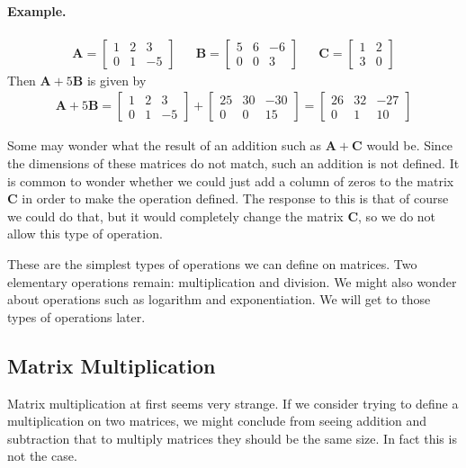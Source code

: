 \documentclass[11pt]{article}
\newcommand{\mat}[1]{\mathbf{#1}}
\begin{document}
\paragraph{Example.}
\begin{align*}
\mat{A} = \begin{bmatrix} 1 & 2 & 3 \\ 0 & 1 & -5\end{bmatrix}
&&
\mat{B} = \begin{bmatrix} 5 & 6 & -6 \\ 0 & 0 & 3\end{bmatrix}
&&
\mat{C} = \begin{bmatrix} 1 & 2 \\ 3 & 0\end{bmatrix}
\end{align*}
Then $\mat{A} + 5\mat{B}$ is given by
\begin{align*}
\mat{A} + 5\mat{B}
=
\begin{bmatrix} 1 & 2 & 3 \\ 0 & 1 & -5\end{bmatrix} +
\begin{bmatrix} 25 & 30 & -30 \\ 0 & 0 & 15\end{bmatrix}
=
\begin{bmatrix} 26 & 32 & -27 \\ 0 & 1 & 10\end{bmatrix}
\end{align*}

Some may wonder what the result of an addition such as $\mat{A} + \mat{C}$ would be. Since the dimensions of these matrices do not match, such an addition is not defined. It is common to wonder whether we could just add a column of zeros to the matrix $\mat{C}$ in order to make the operation defined. The response to this is that of course we could do that, but it would completely change the matrix $\mat{C}$, so we do not allow this type of operation.

These are the simplest types of operations we can define on matrices. Two elementary operations remain: multiplication and division. We might also wonder about operations such as logarithm and exponentiation. We will get to those types of operations later.

\subsection*{Matrix Multiplication}
Matrix multiplication at first seems very strange. If we consider trying to define a multiplication on two matrices, we might conclude from seeing addition and subtraction that to multiply matrices they should be the same size. In fact this is not the case.
\end{document}
